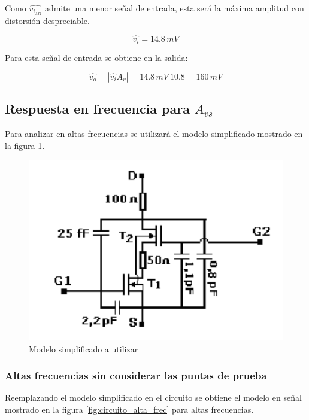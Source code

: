 \documentclass[10pt,spanish,a4paper,notitlepage]{article}
\begin{document}
Como $\widehat{v_{i_{M2}}}$ admite una menor señal de entrada, esta será la
máxima amplitud con distorsión despreciable. 

\[ \displaystyle \widehat{v_i} = 14.8\,\unit{mV} \]


Para esta señal de entrada
se obtiene en la salida:

\[ \displaystyle \widehat{v_o} = | \widehat{v_i} A_v |= 14.8\,\unit{mV}\ 10.8
= 160\,\unit{mV} \]

\subsection{Respuesta en frecuencia para \texorpdfstring{$A_{vs}$}{TEXT}}

Para analizar en altas frecuencias se utilizará el modelo 
simplificado mostrado en la figura \ref{fig:modelo_simplificado}.

\begin{figure}[H]
\centering
\includegraphics[scale=0.75]{circuitos/modelo_simplificado.png}
\caption{Modelo simplificado a utilizar}
\label{fig:modelo_simplificado}
\end{figure}

\subsubsection{Altas frecuencias sin considerar las puntas de prueba}

Reemplazando el modelo simplificado en el circuito se obtiene el modelo en señal
mostrado en la figura \ref{fig:circuito_alta_frec} para altas frecuencias.
\end{document}
